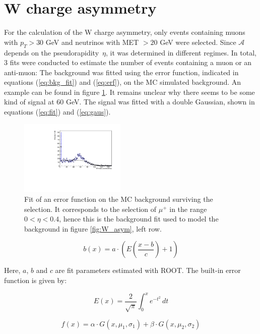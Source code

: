 \documentclass[%
 reprint,
 amsmath,amssymb,
 aps,
]{revtex4-2}
\begin{document}
    
\section{W charge asymmetry}

For the calculation of the W charge asymmetry, only events containing muons with $p_T > 30$ GeV and neutrinos with MET $> 20$ GeV were selected. Since $\mathcal{A}$ depends on the pseudorapidity~$\eta$, it was determined in different regimes. 
In total, 3 fits were conducted to estimate the number of events containing a muon or an anti-muon:
The background was fitted using the error function, indicated in equations (\ref{eq:bkg_fit}) and (\ref{eq:erf}), on the MC simulated background. An example can be found in figure \ref{fig:fit_bkg}. It remains unclear why there seems to be some kind of signal at 60 GeV.  
The signal was fitted with a double Gaussian, shown in equations (\ref{eq:fit}) and (\ref{eq:gaus}). 

\begin{figure}
    \centering
    \includegraphics[width=0.45\textwidth]{Plots/part2/Background_fitpositive_0.pdf}
    \caption{Fit of an error function on the MC background surviving the selection. It corresponds to the selection of $\mu^+$ in the range $0 < \eta < 0.4$, hence this is the background fit used to model the background in figure \ref{fig:W_asym}, left row.}
    \label{fig:fit_bkg}
\end{figure}

\begin{equation}\label{eq:bkg_fit}
    b(x) = a \cdot \left( E \left(\frac{x - b}{c} \right) + 1 \right) 
\end{equation}

Here, $a$, $b$ and $c$ are fit parameters estimated with ROOT. The built-in error function is given by: 

\begin{equation}\label{eq:erf}
    E(x) = \frac{2}{\sqrt{\pi}} \int_0^x e^{-t^2} \, dt
\end{equation}

\begin{equation}\label{eq:fit}
    f(x) = \alpha \cdot G(x, \mu_1, \sigma_1) +  \beta \cdot G(x, \mu_2, \sigma_2)
\end{equation}
\end{document}
